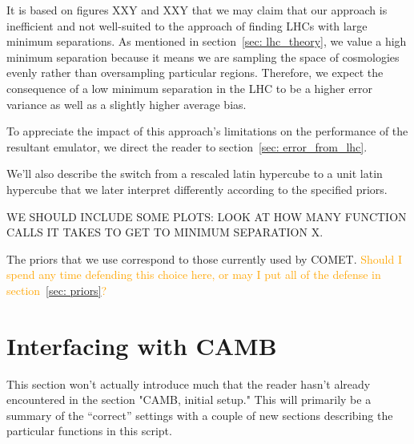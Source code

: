 It is based on figures XXY and XXY that we may claim that our approach is
inefficient and not well-suited to the approach of finding LHCs with large
minimum separations. As mentioned in section~\ref{sec: lhc_theory},
we value a high minimum separation because it means we are sampling the
space of cosmologies evenly rather than oversampling particular regions.
Therefore, we expect the consequence of a low minimum separation in the LHC to
be a higher error variance as well as a slightly higher average bias.


To appreciate the impact of this approach's limitations on the performance of
the resultant emulator, we direct the reader to
section~\ref{sec: error_from_lhc}.



We'll also describe the switch from a rescaled latin hypercube to a unit latin hypercube that we later interpret differently according to the specified priors.

WE SHOULD INCLUDE SOME PLOTS: LOOK AT HOW MANY FUNCTION CALLS IT TAKES TO GET
TO MINIMUM SEPARATION X.


The priors that we use correspond to those currently used by COMET. \textcolor{orange}{Should I spend any time defending this choice here, or may I put all of the defense in section~\ref{sec: priors}?}

\section{Interfacing with CAMB}


This section won't actually introduce much that the reader hasn't already encountered in the section "CAMB, initial setup." This will primarily be a summary of the ``correct'' settings with a couple of new sections describing the particular functions in this script.

